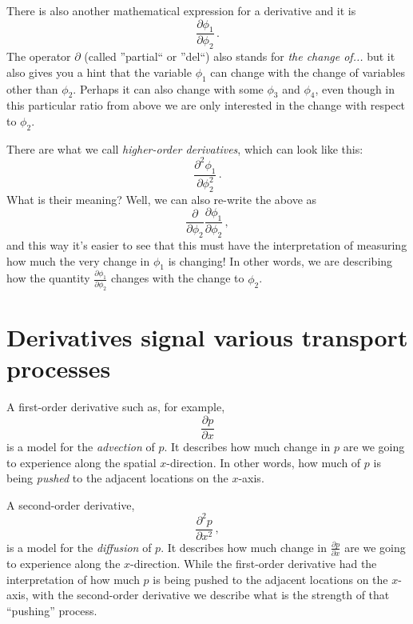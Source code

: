 There is also another mathematical expression for a derivative and it is
\begin{equation*}\label{eq:change-partial}
\frac{\partial \phi_1}{\partial \phi_2} \, .
\end{equation*}
The operator $\partial$ (called ''partial`` or ''del``) also stands for \textit{the change of...} but it also gives you a hint that the variable $\phi_1$ can change with the change of variables other than $\phi_2$. Perhaps it can also change with some $\phi_3$ and $\phi_4$, even though in this particular ratio from above we are only interested in the change with respect to $\phi_2$.

There are what we call \textit{higher-order derivatives}, which can look like this:
\begin{equation*}\label{eq:change-partial-2nd}
\frac{\partial^2 \phi_1}{\partial \phi_2^2} \, .
\end{equation*}
What is their meaning? Well, we can also re-write the above as
\begin{equation*}\label{eq:change-partial}
\frac{\partial}{\partial \phi_2} \frac{\partial \phi_1}{\partial \phi_2} \, ,
\end{equation*}
and this way it's easier to see that this must have the interpretation of measuring how much the very change in $\phi_1$ is changing! In other words, we are describing how the quantity $\frac{\partial \phi_1}{\partial \phi_2}$ changes with the change to $\phi_2$. 

\section{Derivatives signal various transport processes}

A first-order derivative such as, for example,
\begin{equation*}\label{eq:change-partial-1st}
\frac{\partial p}{\partial x}
\end{equation*}
is a model for the \textit{advection} of $p$. It describes how much change in $p$ are we going to experience along the spatial $x$-direction. In other words, how much of $p$ is being \textit{pushed} to the adjacent locations on the $x$-axis.

A second-order derivative,
\begin{equation*}\label{eq:change-partial-2nd}
\frac{\partial^2 p}{\partial x^2} \, ,
\end{equation*}
is a model for the \textit{diffusion} of $p$. It describes how much change in $\frac{\partial p}{\partial x}$ are we going to experience along the $x$-direction. While the first-order derivative had the interpretation of how much $p$ is being pushed to the adjacent locations on the $x$-axis, with the second-order derivative we describe what is the strength of that ``pushing'' process.



